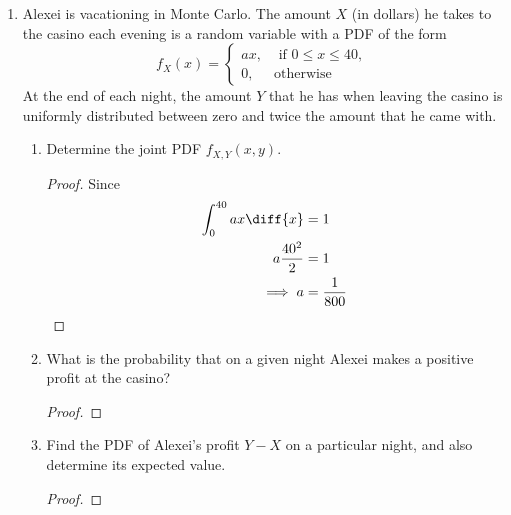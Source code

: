 \documentclass[paper=usletter, fontsize=12pt]{article}
\begin{document}
\begin{enumerate}
\begin{proof}
        \end{proof}

        \item Alexei is vacationing in Monte Carlo. The amount $X$ (in dollars)
        he takes to the casino each evening is a random variable with a PDF of
        the form
        \begin{equation*}
            f_X(x)=
            \begin{cases}
                ax, & \text{ if } 0 \le x \le 40,\\
                0, & \text{otherwise}
            \end{cases}
        \end{equation*}
        At the end of each night, the amount $Y$ that he has when leaving the
        casino is uniformly distributed between zero and twice the amount that
        he came with.
        \begin{enumerate}

            \item Determine the joint PDF $f_{X,Y}(x,y)$.
            \begin{proof}

                Since
                \begin{align*}
                    \int_{0}^{40}ax\diff{x} & = 1\\
                    a\frac{40^2}{2} & = 1\\
                    \implies a & = \frac{1}{800}
                \end{align*}

            \end{proof}

            \item What is the probability that on a given night Alexei makes a
            positive profit at the casino?
            \begin{proof}
            \end{proof}

            \item Find the PDF of Alexei's profit $Y-X$ on a particular night,
            and also determine its expected value.
            \begin{proof}
            \end{proof}

        \end{enumerate}


\end{enumerate}
\end{document}
